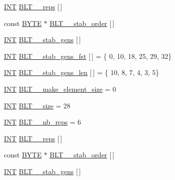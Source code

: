 \begin{DoxyCompactItemize}
\item 
\mbox{\hyperlink{galois_8h_a09fddde158a3a20bd2dcadb609de11dc}{I\+NT}} \mbox{\hyperlink{data___b_l_t_8_c_adae16d8c63df00918f524eee74df2c3c}{B\+L\+T\+\_\+\_\+reps}} \mbox{[}$\,$\mbox{]}
\item 
const \mbox{\hyperlink{galois_8h_ab6cc7b4aeb6ea31aba2b3fbfc83ff5e6}{B\+Y\+TE}} $\ast$ \mbox{\hyperlink{data___b_l_t_8_c_ac2da13ce702a09e83af84c7b33846759}{B\+L\+T\+\_\+\_\+stab\+\_\+order}} \mbox{[}$\,$\mbox{]}
\item 
\mbox{\hyperlink{galois_8h_a09fddde158a3a20bd2dcadb609de11dc}{I\+NT}} \mbox{\hyperlink{data___b_l_t_8_c_a38a459bf1b88eaa1bd0e76fe194a68c0}{B\+L\+T\+\_\+\_\+stab\+\_\+gens}} \mbox{[}$\,$\mbox{]}
\item 
\mbox{\hyperlink{galois_8h_a09fddde158a3a20bd2dcadb609de11dc}{I\+NT}} \mbox{\hyperlink{data___b_l_t_8_c_a092b682901a45332301cae301e5cad03}{B\+L\+T\+\_\+\_\+stab\+\_\+gens\+\_\+fst}} \mbox{[}$\,$\mbox{]} = \{ 0, 10, 18, 25, 29, 32\}
\item 
\mbox{\hyperlink{galois_8h_a09fddde158a3a20bd2dcadb609de11dc}{I\+NT}} \mbox{\hyperlink{data___b_l_t_8_c_a11030068137bb265010c766e0fd6cc61}{B\+L\+T\+\_\+\_\+stab\+\_\+gens\+\_\+len}} \mbox{[}$\,$\mbox{]} = \{ 10, 8, 7, 4, 3, 5\}
\item 
\mbox{\hyperlink{galois_8h_a09fddde158a3a20bd2dcadb609de11dc}{I\+NT}} \mbox{\hyperlink{data___b_l_t_8_c_a63a2ec5679d1c93f6ec561f5f782414e}{B\+L\+T\+\_\+\_\+make\+\_\+element\+\_\+size}} = 0
\item 
\mbox{\hyperlink{galois_8h_a09fddde158a3a20bd2dcadb609de11dc}{I\+NT}} \mbox{\hyperlink{data___b_l_t_8_c_a2246cbd40c50772473f3dc4bd309af74}{B\+L\+T\+\_\+\_\+size}} = 28
\item 
\mbox{\hyperlink{galois_8h_a09fddde158a3a20bd2dcadb609de11dc}{I\+NT}} \mbox{\hyperlink{data___b_l_t_8_c_a546f953ad3351af88a4a26117ec3b660}{B\+L\+T\+\_\+\_\+nb\+\_\+reps}} = 6
\item 
\mbox{\hyperlink{galois_8h_a09fddde158a3a20bd2dcadb609de11dc}{I\+NT}} \mbox{\hyperlink{data___b_l_t_8_c_af2699e6604185ea0a5e1bffd74b0cdf4}{B\+L\+T\+\_\+\_\+reps}} \mbox{[}$\,$\mbox{]}
\item 
const \mbox{\hyperlink{galois_8h_ab6cc7b4aeb6ea31aba2b3fbfc83ff5e6}{B\+Y\+TE}} $\ast$ \mbox{\hyperlink{data___b_l_t_8_c_a4a05363dc43569bb065cf19b861dfa81}{B\+L\+T\+\_\+\_\+stab\+\_\+order}} \mbox{[}$\,$\mbox{]}
\item 
\mbox{\hyperlink{galois_8h_a09fddde158a3a20bd2dcadb609de11dc}{I\+NT}} \mbox{\hyperlink{data___b_l_t_8_c_a0ee734fd6b44801f03abcb80250c3881}{B\+L\+T\+\_\+\_\+stab\+\_\+gens}} \mbox{[}$\,$\mbox{]}

\end{DoxyCompactItemize}
